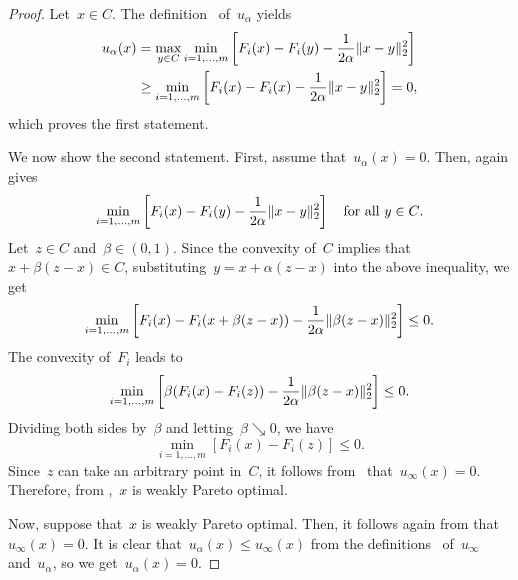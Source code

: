 \documentclass[../../main]{subfiles}
\begin{document}
\begin{proof}
    Let~$x \in C$.
    The definition~ of~$u_\alpha$ yields
    \begin{equation}
        \begin{split}
            u_\alpha(x) &= \max_{y \in C} \min_{i = 1, \dots, m} \left[ F_i(x) - F_i(y) - \frac{1}{2 \alpha} \lVert x - y\rVert_2^2 \right] \\
            &\ge \min_{i = 1, \dots, m} \left[ F_i(x) - F_i(x) - \frac{1}{2 \alpha} \lVert x - y\rVert_2^2 \right] = 0
            ,\end{split}
    \end{equation}
    which proves the first statement.

    We now show the second statement.
    First, assume that~$u_\alpha(x) = 0$.
    Then,  again gives
    \begin{equation}
        \min_{i = 1, \dots, m} \left[ F_i(x) - F_i(y) - \frac{1}{2 \alpha} \lVert x - y\rVert_2^2 \right] \quad \text{for all~$y \in C$}
        .\end{equation}
    Let~$z \in C$ and~$\beta \in (0, 1)$.
    Since the convexity of~$C$ implies that~$x + \beta (z - x) \in C$, substituting~$y = x + \alpha (z - x)$ into the above inequality, we get
    \begin{equation}
        \min_{i = 1, \dots, m} \left[ F_i(x) - F_i(x + \beta (z - x)) - \frac{1}{2 \alpha} \lVert\beta (z - x)\rVert_2^2 \right] \le 0
        .\end{equation}
    The convexity of~$F_i$ leads to
    \begin{equation}
        \min_{i = 1, \dots, m} \left[ \beta (F_i(x) - F_i(z)) - \frac{1}{2 \alpha} \lVert\beta (z - x)\rVert_2^2 \right] \le 0
        .\end{equation}
    Dividing both sides by~$\beta$ and letting~$\beta \searrow 0$, we have
    \begin{equation}
        \min_{i = 1, \dots, m} [ F_i(x) - F_i(z) ] \le 0
        .\end{equation}
    Since~$z$ can take an arbitrary point in~$C$, it follows from~ that~$u_\infty(x) = 0$.
    Therefore, from ,~$x$ is weakly Pareto optimal.

    Now, suppose that~$x$ is weakly Pareto optimal.
    Then, it follows again from  that~$u_\infty(x) = 0$.
    It is clear that~$u_\alpha(x) \le u_\infty(x)$ from the definitions~ of~$u_\infty$ and~$u_\alpha$, so we get~$u_\alpha(x) = 0$.
\end{proof}
\end{document}
